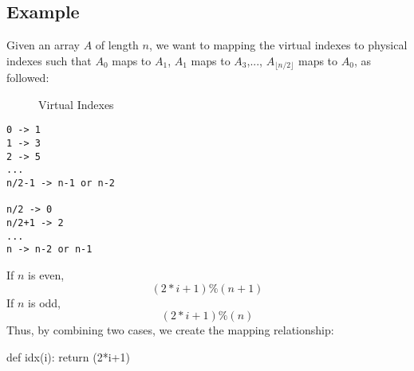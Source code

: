 \subsection{Example}
 Given an array $A$ of length $n$, we want to mapping the virtual indexes to physical indexes such that $A_0$ maps to $A_1$, $A_1$ maps to $A_3$,..., $A_{\lfloor n/2\rfloor}$ maps to $A_0$, as followed: 
\begin{figure}[hbtp]
\centering
{}
\caption{Virtual Indexes}
\label{fig:virtual_indexes}
\end{figure}
\begin{lstlisting}
0 -> 1
1 -> 3
2 -> 5
...
n/2-1 -> n-1 or n-2

n/2 -> 0
n/2+1 -> 2
...
n -> n-2 or n-1
\end{lstlisting}
If $n$ is even, 
$$
(2*i+1)\%(n+1)
$$
If $n$ is odd,
$$
(2*i+1)\%(n)
$$
Thus, by combining two cases, we create the mapping relationship: 
\begin{python}
def idx(i):
    return (2*i+1) %
\end{python}

